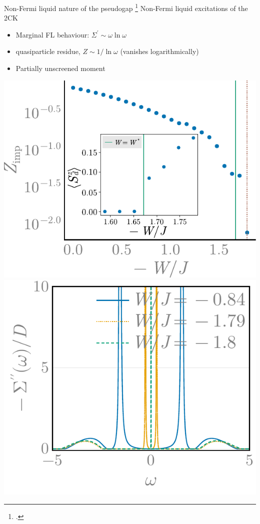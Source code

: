 \documentclass[10pt,aspectratio=169]{beamer}
\begin{document}
\begin{frame}{Non-Fermi liquid nature of the pseudogap}
	\footcite{Coleman_tsvelik,Schofield1997,varma2002singular,Patra2023MCK}
	\alert{Non-Fermi liquid} excitations of the 2CK
	\begin{itemize}
		\item \alert{Marginal FL} behaviour: $\Sigma^{\prime} \sim \omega \ln \omega$
		\item quasiparticle residue, \(Z \sim 1/\ln \omega\) (vanishes logarithmically)
		\item Partially \alert{unscreened} moment
	\end{itemize}
    \includegraphics[width=0.32\linewidth]{localQPResidue.pdf}
    \includegraphics[width=0.32\linewidth]{sigmaImag_49-1000.pdf}
	
\end{frame}
\end{document}
